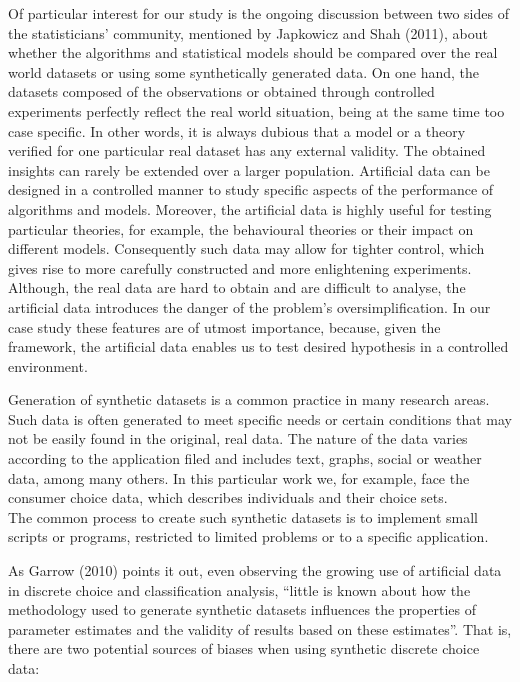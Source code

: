 \documentclass[11pt,]{article}
\begin{document}
Of particular interest for our study is the ongoing discussion between
two sides of the statisticians' community, mentioned by Japkowicz and
Shah (2011), about whether the algorithms and statistical models should
be compared over the real world datasets or using some synthetically
generated data. On one hand, the datasets composed of the observations
or obtained through controlled experiments perfectly reflect the real
world situation, being at the same time too case specific. In other
words, it is always dubious that a model or a theory verified for one
particular real dataset has any external validity. The obtained insights
can rarely be extended over a larger population. Artificial data can be
designed in a controlled manner to study specific aspects of the
performance of algorithms and models. Moreover, the artificial data is
highly useful for testing particular theories, for example, the
behavioural theories or their impact on different models. Consequently
such data may allow for tighter control, which gives rise to more
carefully constructed and more enlightening experiments. Although, the
real data are hard to obtain and are difficult to analyse, the
artificial data introduces the danger of the problem's
oversimplification. In our case study these features are of utmost
importance, because, given the framework, the artificial data enables us
to test desired hypothesis in a controlled environment.

Generation of synthetic datasets is a common practice in many research
areas. Such data is often generated to meet specific needs or certain
conditions that may not be easily found in the original, real data. The
nature of the data varies according to the application filed and
includes text, graphs, social or weather data, among many others. In
this particular work we, for example, face the consumer choice data,
which describes individuals and their choice sets.\\
The common process to create such synthetic datasets is to implement
small scripts or programs, restricted to limited problems or to a
specific application.

As Garrow (2010) points it out, even observing the growing use of
artificial data in discrete choice and classification analysis, ``little
is known about how the methodology used to generate synthetic datasets
influences the properties of parameter estimates and the validity of
results based on these estimates''. That is, there are two potential
sources of biases when using synthetic discrete choice data:
\end{document}
